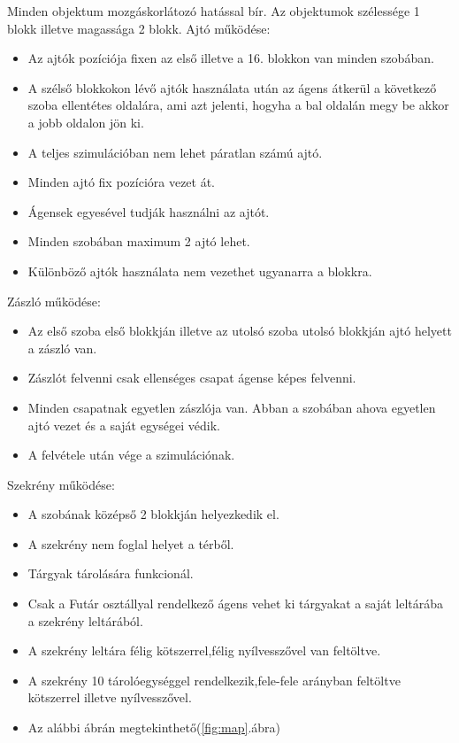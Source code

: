 Minden objektum mozgáskorlátozó hatással bír.
\newline
Az objektumok szélessége 1 blokk illetve magassága 2 blokk.
\newline
Ajtó működése:
\begin{itemize}
\item Az ajtók pozíciója fixen az első illetve a 16. blokkon van minden szobában.
\item A szélső blokkokon lévő ajtók használata után az ágens átkerül a következő szoba ellentétes oldalára, ami azt jelenti, hogyha a bal oldalán megy be akkor a jobb oldalon jön ki.
\item A teljes szimulációban nem lehet páratlan számú ajtó.
\item Minden ajtó fix pozícióra vezet át.
\item Ágensek egyesével tudják használni az ajtót.
\item Minden szobában maximum 2 ajtó lehet.
\item Különböző ajtók használata nem vezethet ugyanarra a blokkra.
\end{itemize}
Zászló működése:
\begin{itemize}
\item Az első szoba első blokkján illetve az utolsó szoba utolsó blokkján ajtó helyett a zászló van.
\item Zászlót felvenni csak ellenséges csapat ágense képes felvenni.
\item Minden csapatnak egyetlen zászlója van. Abban a szobában ahova egyetlen ajtó vezet és a saját egységei védik.
\item A felvétele után vége a szimulációnak.
\end{itemize}
Szekrény működése:
\begin{itemize}
\item A szobának középső 2 blokkján helyezkedik el.
\item A szekrény nem foglal helyet a térből.
\item Tárgyak tárolására funkcionál.
\item Csak a Futár osztállyal rendelkező ágens vehet ki tárgyakat a saját leltárába a szekrény leltárából.
\item A szekrény leltára félig kötszerrel,félig nyílvesszővel van feltöltve.
\item A szekrény 10 tárolóegységgel rendelkezik,fele-fele arányban feltöltve kötszerrel illetve nyílvesszővel.
\item Az alábbi ábrán megtekinthető(\ref{fig:map}.ábra)
\end{itemize}
\newpage

